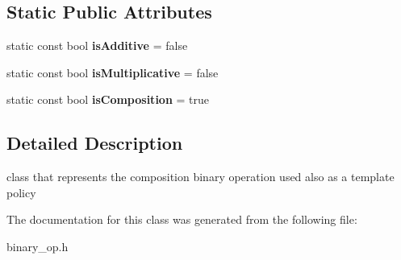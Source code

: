 \subsection*{Static Public Attributes}
\begin{DoxyCompactItemize}
\item 
\hypertarget{classComposition_a3a184cd6b55d3e5cf4f86868d3350c89}{static const bool {\bfseries is\-Additive} = false}\label{classComposition_a3a184cd6b55d3e5cf4f86868d3350c89}

\item 
\hypertarget{classComposition_a4092be14bb95792e50a3670e46455b58}{static const bool {\bfseries is\-Multiplicative} = false}\label{classComposition_a4092be14bb95792e50a3670e46455b58}

\item 
\hypertarget{classComposition_ad088137e0a459dadd3a3c5b89ecdf1d1}{static const bool {\bfseries is\-Composition} = true}\label{classComposition_ad088137e0a459dadd3a3c5b89ecdf1d1}

\end{DoxyCompactItemize}


\subsection{Detailed Description}
class that represents the composition binary operation used also as a template policy 

The documentation for this class was generated from the following file\-:\begin{DoxyCompactItemize}
\item 
binary\-\_\-op.\-h\end{DoxyCompactItemize}
